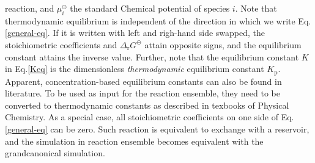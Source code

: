 reaction, and $\mu_i^{\ominus}$ the standard Chemical potential of species $i$.
Note that thermodynamic equilibrium is independent of the direction in which we
write Eq.\ref{general-eq}.  If it is written with left and righ-hand side
swapped, the stoichiometric coefficients and $\Delta_{\mathrm{r}}G^{\ominus}$
attain opposite signs, and the equilibrium constant attains the inverse value.
Further, note that the equilibrium constant $K$ in Eq.\ref{Keq} is the dimensionless
\emph{thermodynamic} equilibrium constant $K_\mathrm{p}$.  Apparent,
concentration-based equilibrium constants can also be found in literature.  To
be used as input for the reaction ensemble, they need to be converted to
thermodynamic constants as described in texbooks of Physical Chemistry.
As a special case, all stoichiometric coefficients on one side
of Eq.\ref{general-eq} can be zero. Such reaction is equivalent
to exchange with a reservoir, and the simulation in reaction ensemble becomes equivalent
with the grandcanonical simulation.

